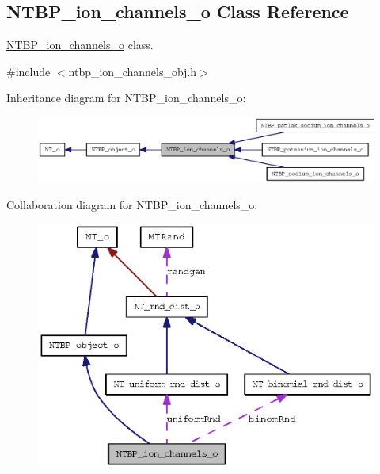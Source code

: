 \subsection{NTBP\_\-ion\_\-channels\_\-o Class Reference}
\label{class_n_t_b_p__ion__channels__o}


\hyperlink{class_n_t_b_p__ion__channels__o}{NTBP\_\-ion\_\-channels\_\-o} class.  




{\ttfamily \#include $<$ntbp\_\-ion\_\-channels\_\-obj.h$>$}



Inheritance diagram for NTBP\_\-ion\_\-channels\_\-o:
\nopagebreak
\begin{figure}[H]
\begin{center}
\leavevmode
\includegraphics[width=400pt]{class_n_t_b_p__ion__channels__o__inherit__graph}
\end{center}
\end{figure}


Collaboration diagram for NTBP\_\-ion\_\-channels\_\-o:
\nopagebreak
\begin{figure}[H]
\begin{center}
\leavevmode
\includegraphics[width=385pt]{class_n_t_b_p__ion__channels__o__coll__graph}
\end{center}
\end{figure}

